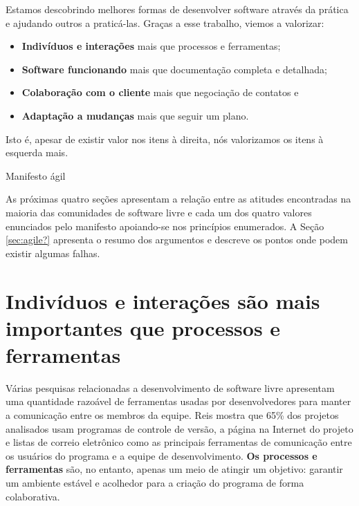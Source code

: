 \begin{caixa}[hb]
  \begin{minipage}{\linewidth}
    \centering Estamos descobrindo melhores formas de desenvolver
    software através da prática e ajudando outros a
    praticá-las. Graças a esse trabalho, viemos a valorizar:

    \begin{center}
      \begin{itemize}
      \item \textbf{Indivíduos e interações} mais que processos e
        ferramentas;
      \item \textbf{Software funcionando} mais que documentação
        completa e detalhada;
      \item \textbf{Colaboração com o cliente} mais que negociação de
        contatos e
      \item \textbf{Adaptação a mudanças} mais que seguir um plano.
      \end{itemize}
    \end{center}

    Isto é, apesar de existir valor nos itens à direita, nós
    valorizamos os itens à esquerda mais.
  \end{minipage}
  \caption{Manifesto ágil}
  \label{box:manifesto}
\end{caixa}

As próximas quatro seções apresentam a relação entre as atitudes
encontradas na maioria das comunidades de software livre e cada um dos
quatro valores enunciados pelo manifesto apoiando-se nos princípios
enumerados. A Seção \ref{sec:agile?} apresenta o resumo dos argumentos
e descreve os pontos onde podem existir algumas falhas.

\section{Indivíduos e interações são mais importantes que processos e
  ferramentas}
\label{sec:first-princ}

Várias pesquisas relacionadas a desenvolvimento de software livre
apresentam uma quantidade razoável de ferramentas usadas por
desenvolvedores para manter a comunicação entre os membros da
equipe. Reis \cite{Reis2003} mostra que 65\% dos projetos analisados
usam programas de controle de versão, a página na Internet do projeto
e listas de correio eletrônico como as principais ferramentas de
comunicação entre os usuários do programa e a equipe de
desenvolvimento. \textbf{Os processos e ferramentas} são, no entanto,
apenas um meio de atingir um objetivo: garantir um ambiente estável e
acolhedor para a criação do programa de forma colaborativa.


